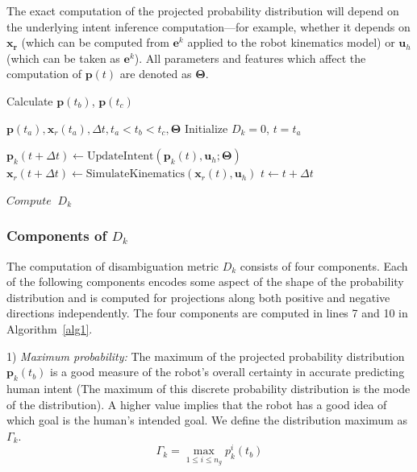 \documentclass[natbib, twocolumn]{svjour3}          %
\begin{document}
 The exact computation of the projected probability distribution will depend on the underlying intent inference computation---for example, whether it depends on $\boldsymbol{x_r}$ (which can be computed from $\boldsymbol{e}^k$ applied to the robot kinematics model) or $\boldsymbol{u}_h$ (which can be taken as $\boldsymbol{e}^k$). All parameters and features which affect the computation of $\boldsymbol{p}(t)$ are denoted as $\boldsymbol{\Theta}$. 


\begin{algorithm}[t]
	\caption{Calculate $\boldsymbol{p}(t_b)$, $\boldsymbol{p}(t_c)$}
	\label{alg1}
	\begin{algorithmic}[1]
		\REQUIRE $\boldsymbol{p}(t_a), \boldsymbol{x}_r(t_a), \Delta t, t_a < t_b < t_c, \boldsymbol{\Theta}$
		\STATE Initialize $D_k = 0$, $t = t_a$

			\STATE $\boldsymbol{p}_k(t + \Delta t) \leftarrow \text{UpdateIntent}(\boldsymbol{p}_k(t), \boldsymbol{u}_h; \boldsymbol{\Theta})$
			\STATE $\boldsymbol{x}_r(t + \Delta t) \leftarrow \text{SimulateKinematics}(\boldsymbol{x}_r(t), \boldsymbol{u}_h)$
			  
			\ENDIF
			  \ENDIF
			\STATE $t \leftarrow t + \Delta t$
		\ENDWHILE

		\STATE $Compute \;\;D_k$
		\ENDFOR
		
	\end{algorithmic}
\end{algorithm}

\subsubsection{Components of $D_k$}\label{sssec:components}
The computation of disambiguation metric $D_k$ consists of four components. Each of the following components encodes some aspect of the shape of the probability distribution and is computed for projections along both positive and negative directions independently. The four components are computed in lines 7 and 10 in Algorithm~\ref{alg1}.

1) \textit{Maximum probability:} The maximum of the projected probability distribution $\boldsymbol{p}_k(t_b)$  is a good measure of the robot's overall certainty in accurate predicting human intent (The maximum of this discrete probability distribution is the mode of the distribution). A higher value implies that the robot has a good idea of which goal is the human's intended goal. We define the distribution maximum as $\Gamma_k$.
\begin{equation}
\Gamma_k = \max\limits_{1 \leq i \leq n_g}p^i_k(t_b)
\end{equation}
\end{document}
